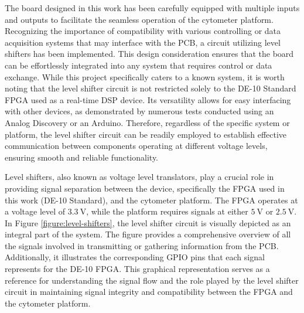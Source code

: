 The board designed in this work has been carefully equipped with multiple inputs and outputs to facilitate the seamless operation of the cytometer platform. Recognizing the importance of compatibility with various controlling or data acquisition systems that may interface with the \ac{PCB}, a circuit utilizing level shifters has been implemented. This design consideration ensures that the board can be effortlessly integrated into any system that requires control or data exchange. While this project specifically caters to a known system, it is worth noting that the level shifter circuit is not restricted solely to the DE-10 Standard \ac{FPGA} used as a real-time \ac{DSP} device. Its versatility allows for easy interfacing with other devices, as demonstrated by numerous tests conducted using an Analog Discovery or an Arduino. Therefore, regardless of the specific system or platform, the level shifter circuit can be readily employed to establish effective communication between components operating at different voltage levels, ensuring smooth and reliable functionality.

Level shifters, also known as voltage level translators, play a crucial role in providing signal separation between the device, specifically the \ac{FPGA} used in this work (DE-10 Standard), and the cytometer platform. The FPGA operates at a voltage level of $\mathrm{3.3~V}$, while the platform requires signals at either $\mathrm{5~V}$ or $\mathrm{2.5~V}$. In Figure \ref{figure:level-shifters}, the level shifter circuit is visually depicted as an integral part of the system. The figure provides a comprehensive overview of all the signals involved in transmitting or gathering information from the \ac{PCB}. Additionally, it illustrates the corresponding \ac{GPIO} pins that each signal represents for the DE-10 \ac{FPGA}. This graphical representation serves as a reference for understanding the signal flow and the role played by the level shifter circuit in maintaining signal integrity and compatibility between the \ac{FPGA} and the cytometer platform.

